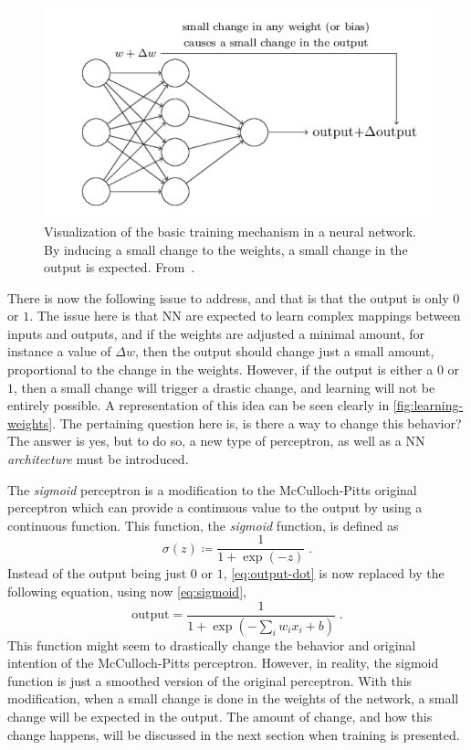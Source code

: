 \begin{figure}
    \centering
    \includegraphics[scale=0.4]{figuras/capitulo-3/learning-weights}
    \caption{Visualization of the basic training mechanism in a neural network. By inducing a small change to the weights, a small change in the output is expected. From~\cite{nielsenNeuralNetworksDeep2015}.}
    \label{fig:learning-weights}
\end{figure}

There is now the following issue to address, and that is that the output is only \(0\) or 
\(1\). The issue here is that NN are expected to learn complex mappings between inputs and 
outputs, and if the weights are adjusted a minimal amount, for instance a value of 
\(\Delta w\), then the output should change just a small amount, proportional to the change 
in the weights. However, if the output is either a \(0\) or \(1\), then a small change will 
trigger a drastic change, and learning will not be entirely possible. A representation 
of this idea can be seen clearly in \autoref{fig:learning-weights}. The pertaining question 
here is, is there a way to change this behavior? The answer is yes, but to do so, a new 
type of perceptron, as well as a NN \emph{architecture} must be introduced.

The \emph{sigmoid} perceptron is a modification to the McCulloch-Pitts original perceptron which can provide a continuous value to the output by using a continuous function. This function, the \emph{sigmoid} function, is defined as
\begin{equation}
    \sigma(z) \coloneqq \frac{1}{1 + \exp{\left( -z \right)}}
    \; .
    \label{eq:sigmoid}
\end{equation}
Instead of the output being just \(0\) or \(1\), \autoref{eq:output-dot} is now replaced by the following equation, using now \autoref{eq:sigmoid},
\begin{equation}
    \text{output} = \frac{1}{1 + \exp{\left(- \sum_{i} w_i x_i + b\right)}}
    \; .
    \label{eq:output-sigmoid}
\end{equation}
This function might seem to drastically change the behavior and original intention of the 
McCulloch-Pitts perceptron. However, in reality, the sigmoid function is just a smoothed 
version of the original perceptron. With this modification, when a small change is done in 
the weights of the network, a small change will be expected in the output. The amount of 
change, and how this change happens, will be discussed in the next section when training is presented.

